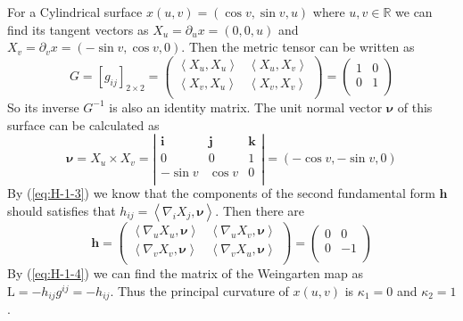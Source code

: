 For a Cylindrical surface $x(u,v)=(\cos{v},\sin{v},u)$ where $u,v\in\mathbb{R}$ we can find its tangent vectors as $X_u=\partial_u x=(0,0,u)$ and $X_v=\partial_v x=(-\sin{v},\cos{v},0)$. Then the metric tensor can be written as
\begin{equation*}
    G={[g_{ij}]}_{2\times 2}=\left(
        \begin{matrix}
            \left<X_u,X_u\right>&    \left<X_u,X_v\right>\\
            \left<X_v,X_u\right>&    \left<X_v,X_v\right>\\
        \end{matrix}
    \right)=\left(\begin{matrix}
        1&    0\\
        0&    1\\
    \end{matrix}\right)
\end{equation*}
So its inverse $G^{-1}$ is also an identity matrix. The unit normal vector $\boldsymbol{\nu}$ of this surface can be calculated as
\begin{equation*}
    \boldsymbol{\nu}=X_u\times X_v=\left|\begin{matrix}
        \boldsymbol{i}&    \boldsymbol{j}&    \boldsymbol{k}\\
        0&    0&    1\\
        -\sin{v}&    \cos{v}&    0\\
    \end{matrix}\right|=(-\cos{v},-\sin{v},0)
\end{equation*}
By (\ref{eq:H-1-3}) we know that the components of the second fundamental form $\boldsymbol{h}$ should satisfies that $h_{ij}=\left<\nabla_i X_j,\boldsymbol{\nu}\right>$. Then there are
\begin{equation*}
    \boldsymbol{h}=\left(\begin{matrix}
        \left<\nabla_u X_u,\boldsymbol{\nu}\right>&    \left<\nabla_u X_v,\boldsymbol{\nu}\right>\\
        \left<\nabla_v X_v,\boldsymbol{\nu}\right>&    \left<\nabla_v X_u,\boldsymbol{\nu}\right>\\
    \end{matrix}\right)=\left(\begin{matrix}
        0&    0\\
        0&    -1\\
    \end{matrix}\right)
\end{equation*}
By (\ref{eq:H-1-4}) we can find the matrix of the Weingarten map as $\mathrm{L}=-h_{ij}g^{ij}=-h_{ij}$. Thus the principal curvature of $x(u,v)$ is $\kappa_1=0$ and $\kappa_2=1$.

